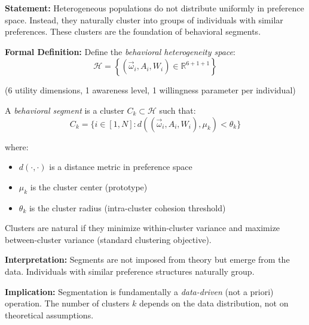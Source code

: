\vspace{1em}

\begin{tcolorbox}[colback=gray!5!white, colframe=gray!75!black,
    title=Axiom SEG-EMERGE-2: Natural Clustering in Preference Space]

\textbf{Statement:}
Heterogeneous populations do not distribute uniformly in preference space. Instead,
they naturally cluster into groups of individuals with similar preferences. These
clusters are the foundation of behavioral segments.

\textbf{Formal Definition:}
Define the \textit{behavioral heterogeneity space}:
\begin{equation}
\mathcal{H} = \left\{ (\vec{\omega}_i, A_i, W_i) \in \mathbb{R}^{6 + 1 + 1} \right\}
\end{equation}

(6 utility dimensions, 1 awareness level, 1 willingness parameter per individual)

A \textit{behavioral segment} is a cluster $C_k \subset \mathcal{H}$ such that:
\begin{equation}
C_k = \{ i \in [1,N] : d((\vec{\omega}_i, A_i, W_i), \mu_k) < \theta_k \}
\end{equation}

where:
\begin{itemize}[nosep]
\item $d(\cdot, \cdot)$ is a distance metric in preference space
\item $\mu_k$ is the cluster center (prototype)
\item $\theta_k$ is the cluster radius (intra-cluster cohesion threshold)
\end{itemize}

Clusters are natural if they minimize within-cluster variance and maximize
between-cluster variance (standard clustering objective).

\textbf{Interpretation:}
Segments are not imposed from theory but emerge from the data. Individuals with
similar preference structures naturally group.

\textbf{Implication:}
Segmentation is fundamentally a \textit{data-driven} (not a priori) operation.
The number of clusters $k$ depends on the data distribution, not on theoretical
assumptions.

\end{tcolorbox}

\vspace{1em}

